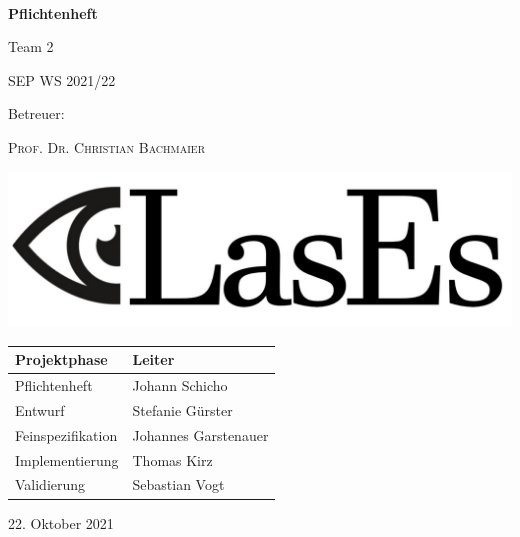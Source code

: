 \documentclass[a4paper,11pt,parskip=half-]{article}
\newcommand{\doubletitle}[2]{\title{#1 \\ [1ex] \normalsize #2}}
\newcommand{\extauthor}[2]{\author{#1 \\ \normalsize #2}}
\begin{document}
	\begin{titlepage}
		\centering

		$~$

		\vspace{0.2cm} %

		\Huge \textbf{Pflichtenheft} \vspace{1cm}

		Team 2
		\Large

		SEP WS 2021/22

		Betreuer:

		\textsc{Prof. Dr. Christian Bachmaier}
		\vspace{2cm}

		\includegraphics[width=0.8\linewidth]{graphics/LasEs-logo}

		\vspace{3cm}

		\begin{table}[H]
			\centering
			\Large
			\begin{tabular}{ll}
				\toprule
				\textbf{Projektphase} & \textbf{Leiter} \\
				\midrule
				Pflichtenheft & Johann Schicho \\
				Entwurf & Stefanie Gürster \\
				Feinspezifikation & Johannes Garstenauer \\
				Implementierung & Thomas Kirz \\
				Validierung & Sebastian Vogt \\
				\bottomrule
			\end{tabular}
		\end{table}

	\vspace{1cm}

	22. Oktober 2021

	\end{titlepage}



\end{document}
